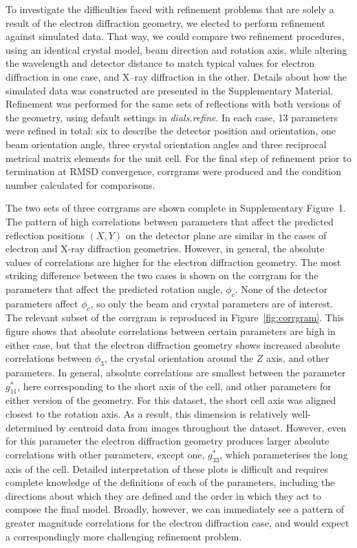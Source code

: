 \documentclass[preprint]{iucr}
\newcommand{\dialsrefine}{\emph{dials.refine}\xspace}
\begin{document}
To investigate the difficulties faced with refinement problems that are solely
a result of the electron diffraction geometry, we elected to perform refinement
against simulated data. That way, we could compare two refinement procedures,
using an identical crystal model, beam direction and rotation axis, while
altering the wavelength and detector distance to match typical values for
electron diffraction in one case, and X--ray diffraction in the other.
Details about how the simulated data was constructed are presented in
the Supplementary Material. Refinement
was performed for the same sets of reflections with both versions
of the geometry, using default settings in
\dialsrefine. In each case, 13 parameters were refined in total: six to
describe the detector position and orientation, one beam orientation angle,
three crystal orientation angles and three reciprocal metrical matrix elements
for the unit cell. For the final step of refinement prior to termination at
RMSD convergence, corrgrams were produced and the condition number calculated
for comparisons.

The two sets of three corrgrams are shown complete in Supplementary Figure~1.
The pattern of high correlations between parameters
that affect the predicted reflection positions $(X, Y)$ on the detector plane
are similar in the cases of electron and X-ray diffraction geometries. However,
in general, the absolute values of correlations are higher for the electron
diffraction geometry. The most striking difference between the two cases is
shown on the corrgram for the parameters that affect the predicted rotation
angle, $\phi_c$. None of the detector parameters affect $\phi_c$, so only the
beam and crystal parameters are of interest. The relevant subset of the
corrgram is reproduced in Figure~\ref{fig:corrgram}. This figure shows that
absolute correlations between certain parameters are high in either case, but
that the electron diffraction geometry shows increased absolute correlations
between $\phi_3$, the crystal orientation around the $Z$ axis, and other
parameters. In general, absolute correlations are smallest between the
parameter $g^*_{11}$, here corresponding to the short axis of the cell, and
other parameters for either version of the geometry. For this dataset, the
short cell axis was aligned closest to the rotation axis. As a result, this
dimension is relatively well-determined by centroid data from images throughout
the dataset. However, even for this parameter the electron diffraction geometry
produces larger absolute correlations with other parameters, except one,
$g^*_{33}$, which parameterises the long axis of the cell. Detailed
interpretation of these plots is difficult and requires complete knowledge of
the definitions of each of the parameters, including the directions about which
they are defined and the order in which they act to compose the final model.
Broadly, however, we can immediately see a pattern of greater magnitude
correlations for the electron diffraction case, and would expect a
correspondingly more challenging refinement problem.
\end{document}
